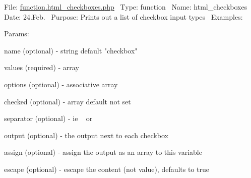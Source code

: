 File\+: \hyperlink{function_8html__checkboxes_8php}{function.\+html\+\_\+checkboxes.\+php}~\newline
 Type\+: function~\newline
 Name\+: html\+\_\+checkboxes~\newline
 Date\+: 24.\+Feb.~\newline
 Purpose\+: Prints out a list of checkbox input types~\newline
 Examples\+: 
 Params\+: 
\begin{DoxyPre}
\begin{DoxyItemize}
\item name       (optional) - string default "checkbox"
\item values     (required) - array
\item options    (optional) - associative array
\item checked    (optional) - array default not set
\item separator  (optional) - ie ~\newline
 or ~
\item output     (optional) - the output next to each checkbox
\item assign     (optional) - assign the output as an array to this variable
\item escape     (optional) - escape the content (not value), defaults to true

\end{DoxyItemize}\end{DoxyPre}



